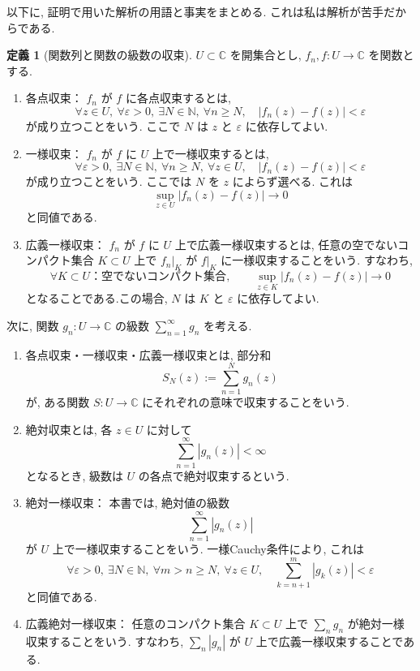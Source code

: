 \documentclass[dvipdfmx,a4paper,11pt]{article} %
\newcommand{\C}{\mathbb{C}}
\theoremstyle{definition}
\numberwithin{equation}{section}
\newtheorem{dfn}[thm]{定義}
\begin{document}
以下に, 証明で用いた解析の用語と事実をまとめる.
これは私は解析が苦手だからである. 

\begin{dfn}[関数列と関数の級数の収束]
$U\subset\C$ を開集合とし, $f_n,f:U\to\C$ を関数とする.
\begin{enumerate}
\item

各点収束：
$f_n$ が $f$ に各点収束するとは, 
\[
\forall z\in U,\ \forall\varepsilon>0,\ 
\exists N\in\mathbb N,\ \forall n\geq N,\quad
|f_n(z)-f(z)|<\varepsilon
\]
が成り立つことをいう.
ここで $N$ は $z$ と $\varepsilon$ に依存してよい.

\item

一様収束：
$f_n$ が $f$ に $U$ 上で一様収束するとは, 
\[
\forall\varepsilon>0,\ \exists N\in\mathbb N,\ 
\forall n\geq N,\ \forall z\in U,\quad
|f_n(z)-f(z)|<\varepsilon
\]
が成り立つことをいう.
ここでは $N$ を $z$ によらず選べる.
これは
\[
\sup_{z\in U}|f_n(z)-f(z)|\longrightarrow0
\]
と同値である.

\item

広義一様収束：
$f_n$ が $f$ に $U$ 上で広義一様収束するとは, 
任意の空でないコンパクト集合 $K\subset U$ 上で
$f_n|_K$ が $f|_K$ に一様収束することをいう.
すなわち, 
\[
\forall K\subset U\text{：空でないコンパクト集合},\qquad
\sup_{z\in K}|f_n(z)-f(z)|\longrightarrow0
\]
となることである.この場合, $N$ は $K$ と $\varepsilon$ に依存してよい.
\end{enumerate}

次に, 関数 $g_n:U\to\C$ の級数
$\sum_{n=1}^{\infty}g_n$ を考える.
\begin{enumerate}
\item

各点収束・一様収束・広義一様収束とは,
部分和
\[
S_N(z):=\sum_{n=1}^{N}g_n(z)
\]
が, ある関数 $S:U\to\C$ にそれぞれの意味で収束することをいう.

\item

絶対収束とは,
各 $z\in U$ に対して
\[
\sum_{n=1}^{\infty}|g_n(z)|<\infty
\]
となるとき, 級数は $U$ の各点で絶対収束するという.

\item

絶対一様収束：
本書では, 絶対値の級数
\[
\sum_{n=1}^{\infty}|g_n(z)|
\]
が $U$ 上で一様収束することをいう.
一様Cauchy条件により, これは
\[
\forall\varepsilon>0,\ \exists N\in\mathbb N,\ 
\forall m>n\geq N,\ \forall z\in U,\quad
\sum_{k=n+1}^{m}|g_k(z)|<\varepsilon
\]
と同値である.

\item

広義絶対一様収束：
任意のコンパクト集合 $K\subset U$ 上で
$\sum_n g_n$ が絶対一様収束することをいう.
すなわち, $\sum_n|g_n|$ が $U$ 上で広義一様収束することである.
\end{enumerate}
\end{dfn}
\end{document}
